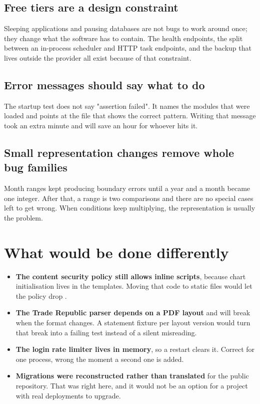 \subsection{Free tiers are a design constraint}

Sleeping applications and pausing databases are not bugs to work around once;
they change what the software has to contain. The health endpoints, the split
between an in-process scheduler and HTTP task endpoints, and the backup that
lives outside the provider all exist because of that constraint.

\subsection{Error messages should say what to do}

The startup test does not say "assertion failed". It names the modules that were
loaded and points at the file that shows the correct pattern. Writing that
message took an extra minute and will save an hour for whoever hits it.

\subsection{Small representation changes remove whole bug families}

Month ranges kept producing boundary errors until a year and a month became one
integer. After that, a range is two comparisons and there are no special cases
left to get wrong. When conditions keep multiplying, the representation is
usually the problem.

\section{What would be done differently}

\begin{itemize}
  \item \textbf{The content security policy still allows inline scripts},
        because chart initialisation lives in the templates. Moving that code to
        static files would let the policy drop .
  \item \textbf{The Trade Republic parser depends on a PDF layout} and will
        break when the format changes. A statement fixture per layout version
        would turn that break into a failing test instead of a silent
        misreading.
  \item \textbf{The login rate limiter lives in memory}, so a restart clears it.
        Correct for one process, wrong the moment a second one is added.
  \item \textbf{Migrations were reconstructed rather than translated} for the
        public repository. That was right here, and it would not be an option
        for a project with real deployments to upgrade.
\end{itemize}

